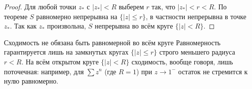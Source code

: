 \begin{proof}
	Для любой точки $z_*$ с $|z_*| < R$ выберем $r$ так, что $|z_*| < r < R$. По теореме $S$ равномерно непрерывна на $\{|z| \le r\}$, в частности непрерывна в точке $z_*$. Так как $z_*$ произвольна, $S$ непрерывна во всём круге $\{|z| < R\}$.
\end{proof}

\begin{Remark}{Сходимость не обязана быть равномерной во всём круге}{}
	Равномерность гарантируется лишь на замкнутых кругах $\{|z| \le r\}$ строго меньшего радиуса $r < R$. На всём открытом круге $\{|z| < R\}$ сходимость, вообще говоря, лишь поточечная: например, для $\sum z^n$ (где $R = 1$) при $z \to 1^-$ остаток не стремится к нулю равномерно.
\end{Remark}
